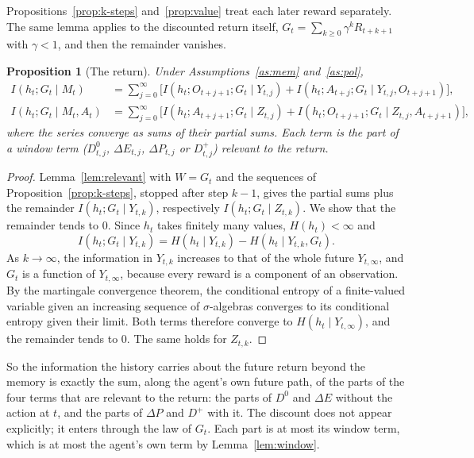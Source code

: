 \documentclass{article}
\newtheorem{proposition}{Proposition}
\theoremstyle{definition}
\theoremstyle{remark}
\newcommand{\dE}{\Delta E}
\newcommand{\dP}{\Delta P}
\begin{document}
Propositions~\ref{prop:k-steps} and~\ref{prop:value} treat each later reward separately. The same lemma applies to the discounted return itself, $G_t=\sum_{k\ge0}\gamma^kR_{t+k+1}$ with $\gamma<1$, and then the remainder vanishes.

\begin{proposition}[The return]\label{prop:return}
Under Assumptions~\ref{as:mem} and~\ref{as:pol},
\begin{align*}
I(h_t;G_t\mid M_t)&=\sum_{j=0}^{\infty}\Big[I(h_t;O_{t+j+1};G_t\mid Y_{t,j})+I(h_t;A_{t+j};G_t\mid Y_{t,j},O_{t+j+1})\Big],\\
I(h_t;G_t\mid M_t,A_t)&=\sum_{j=0}^{\infty}\Big[I(h_t;A_{t+j+1};G_t\mid Z_{t,j})+I(h_t;O_{t+j+1};G_t\mid Z_{t,j},A_{t+j+1})\Big],
\end{align*}
where the series converge as sums of their partial sums. Each term is the part of a window term ($D^0_{t,j}$, $\dE_{t,j}$, $\dP_{t,j}$ or $D^+_{t,j}$) relevant to the return.
\end{proposition}

\begin{proof}
Lemma~\ref{lem:relevant} with $W=G_t$ and the sequences of Proposition~\ref{prop:k-steps}, stopped after step $k-1$, gives the partial sums plus the remainder $I(h_t;G_t\mid Y_{t,k})$, respectively $I(h_t;G_t\mid Z_{t,k})$. We show that the remainder tends to $0$. Since $h_t$ takes finitely many values, $H(h_t)<\infty$ and
\[
I(h_t;G_t\mid Y_{t,k})=H(h_t\mid Y_{t,k})-H(h_t\mid Y_{t,k},G_t).
\]
As $k\to\infty$, the information in $Y_{t,k}$ increases to that of the whole future $Y_{t,\infty}$, and $G_t$ is a function of $Y_{t,\infty}$, because every reward is a component of an observation. By the martingale convergence theorem, the conditional entropy of a finite-valued variable given an increasing sequence of $\sigma$-algebras converges to its conditional entropy given their limit. Both terms therefore converge to $H(h_t\mid Y_{t,\infty})$, and the remainder tends to $0$. The same holds for $Z_{t,k}$.
\end{proof}

So the information the history carries about the future return beyond the memory is exactly the sum, along the agent's own future path, of the parts of the four terms that are relevant to the return: the parts of $D^0$ and $\dE$ without the action at $t$, and the parts of $\dP$ and $D^+$ with it. The discount does not appear explicitly; it enters through the law of $G_t$. Each part is at most its window term, which is at most the agent's own term by Lemma~\ref{lem:window}.
\end{document}
